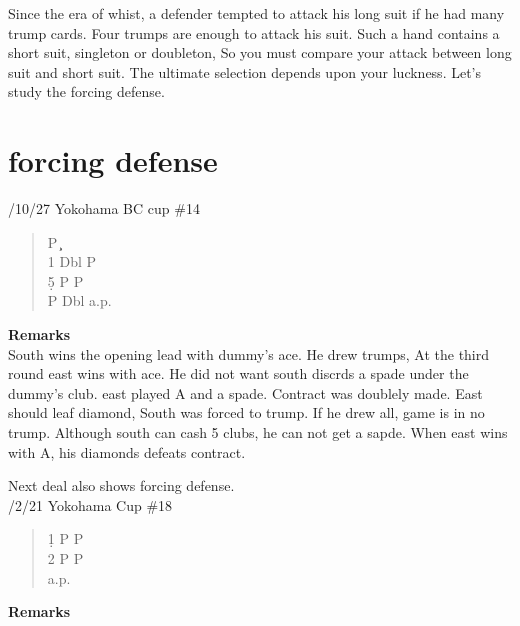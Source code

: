 Since the era of whist, a defender tempted to attack
his long suit if he had many trump cards. Four trumps are
enough to attack his suit. Such a hand contains a short suit,
singleton or doubleton, So you must compare  your 
attack between long suit and short suit. The ultimate selection depends upon
your luckness. Let's study the forcing defense.


\section{forcing defense}
/10/27 Yokohama BC cup \#14
\begin{quote}
%
  {}%
  {}
  {}%
  {}%
\end{quote}
\begin{quote}
\begin{bidding}
P  \c {}\d  {}\h \\
1\s \> Dbl \> P \h \\
5\d \> P \> P  \h \\
P \> Dbl \>a.p.
\end{bidding}
\end{quote}
{\bf Remarks}\\

South wins the opening lead with dummy's ace. He drew trumps,
At the third round east wins with ace. He did not want south discrds a
spade under the dummy's club. east played \s A and a spade. Contract
was doublely made. East should leaf diamond, South was forced to trump.
If he drew all, game is in no trump. Although south can cash 5 clubs, 
he can not get a sapde. When east wins with \s A, his diamonds defeats
contract.
\vspace{0.5cm}

Next deal also shows forcing defense.\\
/2/21 Yokohama Cup \#18

\begin{quote}
%
  {}%
  {}
  {}%
  {}%
\end{quote}
\begin{quote}
\begin{bidding}
1\d \> P \s  \> P \\
2\s \> P \> P \h \\
a.p.
\end{bidding}
\end{quote}
{\bf Remarks}\\


